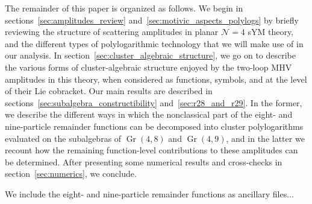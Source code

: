 \documentclass[11pt]{article}
\DeclareMathOperator{\Gr}{Gr}
\begin{document}
The remainder of this paper is organized as follows. We begin in sections~\ref{sec:amplitudes_review} and~\ref{sec:motivic_aspects_polylogs} by briefly reviewing the structure of scattering amplitudes in planar $\mathcal{N}=4$ sYM theory, and the different types of polylogarithmic technology that we will make use of in our analysis. In section~\ref{sec:cluster_algebraic_structure}, we go on to describe the various forms of cluster-algebraic structure enjoyed by the two-loop MHV amplitudes in this theory, when considered as functions, symbols, and at the level of their Lie cobracket. Our main results are described in sections~\ref{sec:subalgebra_constructibility} and~\ref{sec:r28_and_r29}. In the former, we describe the different ways in which the nonclassical part of the eight- and nine-particle remainder functions can be decomposed into cluster polylogarithms evaluated on the subalgebras of $\Gr(4,8)$ and $\Gr(4,9)$, and in the latter we recount how the remaining function-level contributions to these amplitudes can be determined. After presenting some numerical results and cross-checks in section~\ref{sec:numerics}, we conclude.

We include the eight- and nine-particle remainder functions as ancillary files...  
  
 


\end{document}
